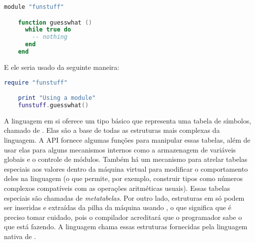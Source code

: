       \vspace{1em}

    \begin{lstlisting}[language=lua]
    module "funstuff"

    function guesswhat ()
      while true do
        -- nothing
      end
    end

    \end{lstlisting}
      
      \vspace{1em}

      E ele seria usado da seguinte maneira:
      
      \vspace{1em}

    \begin{lstlisting}[language=lua]
    require "funstuff"

    print "Using a module"
    funstuff.guesswhat()
    \end{lstlisting}
      
      \vspace{1em}

      A linguagem  em si oferece um tipo básico que representa uma
      tabela de símbolos\footnotemark{}, chamado de . Elas são a
      base de todas as estruturas mais complexas da linguagem. A API fornece
      algumas funções para manipular essas tabelas, além de usar elas para
      alguns mecanismos internos como a armazenagem de variáveis globais e o
      controle de módulos. Também há um mecanismo para atrelar tabelas
      especiais aos valores dentro da máquina virtual para modificar o
      comportamento deles na linguagem (o que permite, por exemplo, construir
      tipos como números complexos compatíveis com as operações aritméticas
      usuais). Essas tabelas especiais são chamadas de \emph{metatabelas}.
      Por outro lado, estruturas em \C{} só podem ser inseridas e extraídas da
      pilha da máquina usando , o que significa que é preciso tomar
      cuidado, pois o compilador acreditará que o programador sabe o que está
      fazendo. A linguagem chama essas estruturas fornecidas pela linguagem
      nativa de .


